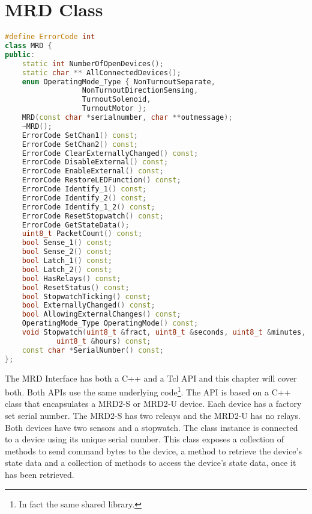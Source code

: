 \section{MRD Class}
\begin{lstlisting}[caption={MRD Class},
		   language=C++,label=lst:MRD:MRDClass]
#define ErrorCode int
class MRD {
public:
	static int NumberOfOpenDevices();
	static char ** AllConnectedDevices();
	enum OperatingMode_Type { NonTurnoutSeparate,
				  NonTurnoutDirectionSensing, 
				  TurnoutSolenoid, 
				  TurnoutMotor };
	MRD(const char *serialnumber, char **outmessage);
	~MRD();
	ErrorCode SetChan1() const;
	ErrorCode SetChan2() const;
	ErrorCode ClearExternallyChanged() const;
	ErrorCode DisableExternal() const;
	ErrorCode EnableExternal() const;
	ErrorCode RestoreLEDFunction() const;
	ErrorCode Identify_1() const;
	ErrorCode Identify_2() const;
	ErrorCode Identify_1_2() const;
	ErrorCode ResetStopwatch() const;
	ErrorCode GetStateData();
	uint8_t PacketCount() const;
	bool Sense_1() const;
	bool Sense_2() const;
	bool Latch_1() const;
	bool Latch_2() const;
	bool HasRelays() const;
	bool ResetStatus() const;
	bool StopwatchTicking() const;
	bool ExternallyChanged() const;
	bool AllowingExternalChanges() const;
	OperatingMode_Type OperatingMode() const;
	void Stopwatch(uint8_t &fract, uint8_t &seconds, uint8_t &minutes,
			uint8_t &hours) const;
	const char *SerialNumber() const;
};
\end{lstlisting}
The MRD Interface\cite{internals} has both a C++ and a Tcl API and
this chapter will cover both. Both APIs use the same underlying 
code\footnote{In fact the same shared library.}. The API is based on a
C++ class that encapsulates a MRD2-S or MRD2-U device.  Each device has a
factory set serial number.  The MRD2-S has two releays and the MRD2-U
has no relays.  Both devices have two sensors and a stopwatch. The class
instance is connected to a device using its unique serial number. This
class exposes a collection of methods to send command bytes to the
device, a method to retrieve the device's state data and a collection of
methods to access the device's state data, once it has been retrieved.

